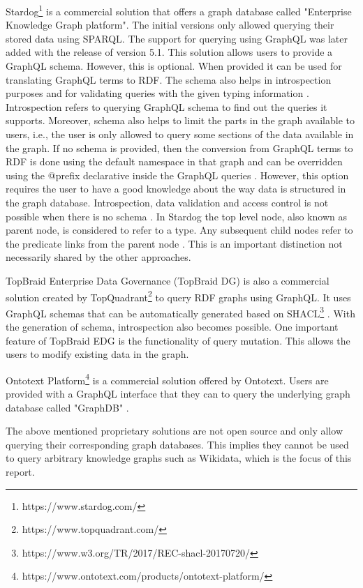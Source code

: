 Stardog\footnote{https://www.stardog.com/} is a commercial solution that offers a graph database called "Enterprise Knowledge Graph platform"\cite{Angele2022}. The initial versions only allowed querying their stored data using SPARQL. The support for querying using GraphQL was later added with the release of version 5.1. This solution allows users to provide a GraphQL schema. However, this is optional. When provided it can be used for translating GraphQL terms to RDF. The schema also helps in introspection purposes and for validating queries with the given typing information \cite{Gleim2020}. Introspection refers to querying GraphQL schema to find out the queries it supports. Moreover, schema also helps to limit the parts in the graph available to users, i.e., the user is only allowed to query some sections of the data available in the graph. If no schema is provided, then the conversion from GraphQL terms to RDF is done using the default namespace in that graph and can be overridden using the @prefix declarative inside the GraphQL queries \cite{Taelman2019}. However, this option requires the user to have a good knowledge about the way data is structured in the graph database. Introspection, data validation and access control is not possible when there is no schema \cite{Gleim2020}. In Stardog the top level node, also known as parent node, is considered to refer to a type. Any subsequent child nodes refer to the predicate links from the parent node \cite{Taelman2019}. This is an important distinction not necessarily shared by the other approaches.

TopBraid Enterprise Data Governance (TopBraid DG) is also a commercial solution created by TopQuadrant\footnote{https://www.topquadrant.com/} to query RDF graphs using GraphQL. It uses GraphQL schemas that can be automatically generated based on SHACL\footnote{https://www.w3.org/TR/2017/REC-shacl-20170720/} \cite{Taelman2019}. With the generation of schema, introspection also becomes possible. One important feature of TopBraid EDG is the functionality of query mutation. This allows the users to modify existing data in the graph.

Ontotext Platform\footnote{https://www.ontotext.com/products/ontotext-platform/} is a commercial solution offered by Ontotext. Users are provided with a GraphQL interface that they can to query the underlying graph database called "GraphDB" \cite{Angele2022}. 

The above mentioned proprietary solutions are not open source and only allow querying their corresponding graph databases. This implies they cannot be used to query arbitrary knowledge graphs such as Wikidata, which is the focus of this report.

